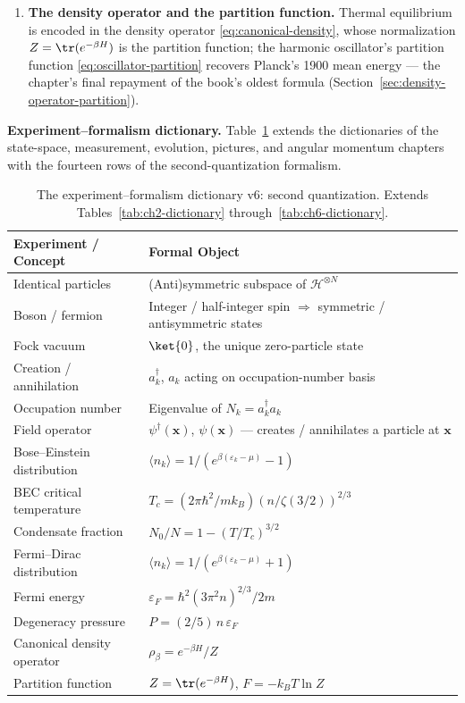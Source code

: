 \begin{enumerate}
    \item[(Q6)] \textbf{The density operator and the partition function.} Thermal equilibrium is encoded in the density operator \eqref{eq:canonical-density}, whose normalization $Z = \tr(e^{-\beta H})$ is the partition function; the harmonic oscillator's partition function \eqref{eq:oscillator-partition} recovers Planck's 1900 mean energy --- the chapter's final repayment of the book's oldest formula (Section~\ref{sec:density-operator-partition}).
\end{enumerate}

\medskip\noindent\textbf{Experiment--formalism dictionary.}
Table~\ref{tab:ch10-dictionary} extends the dictionaries of the state-space, measurement, evolution, pictures, and angular momentum chapters with the fourteen rows of the second-quantization formalism.

\begin{table}[h]
    \caption{The experiment--formalism dictionary v6: second quantization. Extends Tables~\ref{tab:ch2-dictionary} through~\ref{tab:ch6-dictionary}.}
    \label{tab:ch10-dictionary}
    \begin{tabular}{p{} p{}}
        \toprule
        \textbf{Experiment / Concept} & \textbf{Formal Object} \\
        \midrule
        Identical particles & (Anti)symmetric subspace of $\mathcal{H}^{\otimes N}$ \\
        Boson / fermion & Integer / half-integer spin $\Rightarrow$ symmetric / antisymmetric states \\
        Fock vacuum & $\ket{0}$, the unique zero-particle state \\
        Creation / annihilation & $a_k^\dagger$, $a_k$ acting on occupation-number basis \\
        Occupation number & Eigenvalue of $N_k = a_k^\dagger a_k$ \\
        Field operator & $\psi^\dagger(\bm x)$, $\psi(\bm x)$ --- creates / annihilates a particle at $\bm x$ \\
        Bose--Einstein distribution & $\langle n_k \rangle = 1/(e^{\beta(\varepsilon_k-\mu)} - 1)$ \\
        BEC critical temperature & $T_c = (2\pi\hbar^2/m k_B)(n/\zeta(3/2))^{2/3}$ \\
        Condensate fraction & $N_0/N = 1 - (T/T_c)^{3/2}$ \\
        Fermi--Dirac distribution & $\langle n_k \rangle = 1/(e^{\beta(\varepsilon_k-\mu)} + 1)$ \\
        Fermi energy & $\varepsilon_F = \hbar^2(3\pi^2 n)^{2/3}/2m$ \\
        Degeneracy pressure & $P = (2/5)\,n\,\varepsilon_F$ \\
        Canonical density operator & $\rho_\beta = e^{-\beta H}/Z$ \\
        Partition function & $Z = \tr(e^{-\beta H})$, $F = -k_B T\ln Z$ \\
        \bottomrule
    \end{tabular}
\end{table}

